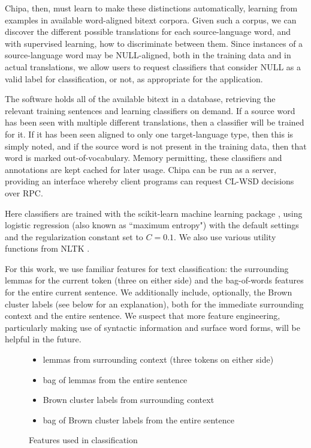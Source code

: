 \documentclass[10pt, a4paper]{article}
\begin{document}
Chipa, then, must learn to make these distinctions automatically, learning from
examples in available word-aligned bitext corpora. Given such a corpus, we can
discover the different possible translations for each source-language word, and
with supervised learning, how to discriminate between them.  Since instances of
a source-language word may be NULL-aligned, both in the training data and in
actual translations, we allow users to request classifiers that consider NULL
as a valid label for classification, or not, as appropriate for the
application.

The software holds all of the available bitext in a database, retrieving the
relevant training sentences and learning classifiers on demand.
If a source word has been seen with multiple different translations, then a
classifier will be trained for it. If it has been seen aligned to only one
target-language type, then this is simply noted, and if the source word is not
present in the training data, then that word is marked out-of-vocabulary.
Memory permitting, these classifiers and annotations are kept cached for later
usage. Chipa can be run as a server, providing an interface whereby client
programs can request CL-WSD decisions over RPC.

Here classifiers are trained with the scikit-learn machine learning package
\cite{scikit-learn}, using logistic regression (also known as ``maximum
entropy") with the default settings and the regularization constant set to
$C=0.1$. We also use various utility functions from NLTK \cite{nltkbook}. 

For this work, we use familiar features for text classification: the
surrounding lemmas for the current token (three on either side) and the
bag-of-words features for the entire current sentence. We additionally include,
optionally, the Brown cluster labels (see below for an explanation),
both for the immediate surrounding context and the entire sentence.
We suspect that more feature engineering, particularly making use of syntactic
information and surface word forms, will be helpful in the future.

\begin{figure}[t!]
  \begin{itemize}
    \item lemmas from surrounding context (three tokens on either side)
    \item bag of lemmas from the entire sentence
    \item Brown cluster labels from surrounding context
    \item bag of Brown cluster labels from the entire sentence
  \end{itemize}
\caption{Features used in classification}
\label{fig:features}
\end{figure}
\end{document}
